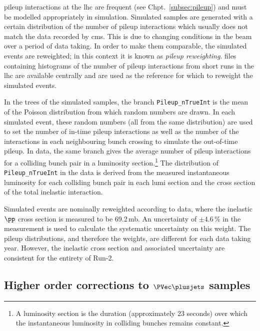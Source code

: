 \Gls{pileup} interactions at the \acrshort{lhc} are frequent (see Chpt.~\ref{subsec:pileup}) and must be modelled appropriately in simulation. Simulated samples are generated with a certain distribution of the number of \gls{pileup} interactions which usually does not match the data recorded by \acrshort{cms}. This is due to changing conditions in the beam over a period of data taking. In order to make them comparable, the simulated events are reweighted; in this context it is known as \emph{\gls{pileup} reweighting}. \ROOT files containing histograms of the number of \gls{pileup} interactions from short runs in the \acrshort{lhc} are available centrally and are used as the reference for which to reweight the simulated events.

In the trees of the simulated samples, the branch \texttt{Pileup\_nTrueInt} is the mean of the Poisson distribution from which random numbers are drawn. In each simulated event, these random numbers (all from the same distribution) are used to set the number of in-time \gls{pileup} interactions as well as the number of the interactions in each neighbouring bunch crossing to simulate the out-of-time \gls{pileup}. In data, the same branch gives the average number of \gls{pileup} interactions for a colliding bunch pair in a luminosity section.\footnote{A luminosity section is the duration (approximately 23 seconds) over which the instantaneous luminosity in colliding bunches remains constant.} The distribution of \texttt{Pileup\_nTrueInt} in the data is derived from the measured instantaneous luminosity for each colliding bunch pair in each lumi section and the cross section of the total inelastic \pp interaction.

Simulated events are nominally reweighted according to data, where the inelastic $\pp$ cross section is measured to be 69.2\,mb. An uncertainty of $\pm \text{4.6}$\,\% in the measurement is used to calculate the systematic uncertainty on this weight. The pileup distributions, and therefore the weights, are different for each data taking year. However, the inelastic cross section and associated uncertainty are consistent for the entirety of Run-2.





\subsection{Higher order corrections to \texorpdfstring{$\PVec \plusjets$}{V plus jets} samples}
\label{subsec:htoinv_nlo_corrs}

